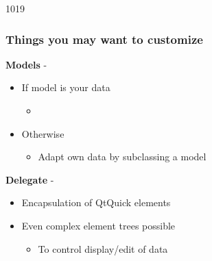 \begin{slide}[fragile]{1019}\frametitle{Things you may want to customize}
\textbf{Models} - 
\begin{itemize}
\item If model is your data
  \begin{itemize}
  \item {}
  \end{itemize}
\item Otherwise
  \begin{itemize}
  \item Adapt own data by subclassing a model
  \end{itemize}
\end{itemize}
\textbf{Delegate} - 
\begin{itemize}
\item Encapsulation of QtQuick elements
\item Even complex element trees possible
  \begin{itemize}
  \item To control display/edit of data
  \end{itemize}
\end{itemize}
\end{slide}
